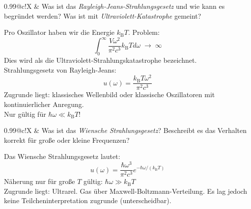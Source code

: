 \documentclass[a4paper,12pt]{scrartcl}
\makeatletter
\def\df#1#2{\dfrac{#1}{#2}}				%
\def\kB{k_\mathrm{B}}					%
\newcounter{qc}\setcounter{qc}{1}
\newenvironment{fshaded}{
\def\FrameCommand{\fcolorbox{framecolor}{shadecolor}}
\MakeFramed {\FrameRestore}}
{\endMakeFramed}
\def\frage#1{
\begin{fshaded}
\noindent
\begin{tabularx}{0.99\textwidth}{@{}c!{\color{framecolor}\vline}X}
{ \bf \rm \theqc }	&	\noindent #1
\end{tabularx}
\stepcounter{qc}
\end{fshaded}
}
\makeatother
\begin{document}

\frage{Was ist das \textit{Rayleigh-Jeans-Strahlungsgesetz} und wie kann es begründet werden? Was ist mit 
\textit{Ultraviolett-Katastrophe} gemeint?}
\noindent
Pro Oszillator haben wir die Energie $\kB  T$. Problem:\\
\[ \int_0^\infty \df{V\omega^2}{\pi^2c^3}\kB  T d\omega\; \rightarrow\; \infty \]
Dies wird als die Ultraviolett-Strahlungskatastrophe bezeichnet.\\
Strahlungsgesetz von Rayleigh-Jeans:
\[ u(\omega)=\df{\kB  T \omega^2}{\pi^2 c^3}\]
Zugrunde liegt: klassisches Wellenbild oder klassische Oszillatoren mit kontinuierlicher Anregung.\\
Nur gültig für $\hbar \omega \ll \kB  T$!



\frage{Was ist das \textit{Wiensche Strahlungsgesetz}? Beschreibt es das Verhalten korrekt für große oder kleine Frequenzen?}
\noindent
Das Wiensche Strahlungsgesetz lautet:
\[ u(\omega)=\df{\hbar \omega^3}{\pi^2 c^3} e^{-\hbar \omega/(\kB  T)} \]
Näherung nur für große $T$ gültig: $\hbar \omega \gg \kB  T$\\
Zugrunde liegt: Ultrarel. Gas über Maxwell-Boltzmann-Verteilung. Es lag jedoch keine Teilcheninterpretation zugrunde 
(unterscheidbar).

\end{document}

